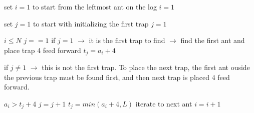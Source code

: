 \documentclass[11pt]{article}
\begin{document}
\begin{enumerate}
\begin{codebox}
		\li \Comment set $i=1$ to start from the leftmost ant on the log 
		\li $i=1$

		\li \Comment set $j=1$ to start with initializing the first trap 
		\li $j=1$
		
		\li \While $i\leq N$
			\Do	
		\li 	\If $j==1$
				\Do
		\li \Comment if $j=1$ $\rightarrow$ it is the first trap to find $\rightarrow$ find the first ant and place trap 4 feed forward 
		\li 		$t_j=a_i+4$

		\li 	\Else
		\li \Comment if $j \neq 1$ $\rightarrow$ this is not the first trap. To place the next trap, the first ant ouside 
		\li \Comment the previous trap must be found first, and then next trap is placed 4 feed forward.

		\li			\If $a_i>t_j+4$
					\Do
		\li 			$j=j+1$
		\li				$t_j=min(a_i+4,L)$
					\End
				\End
		\li \Comment iterate to next ant
		\li $i=i+1$
			\End

		
	\end{codebox}





	
	
	
	
	
	





































   
\end{enumerate}
\end{document}
